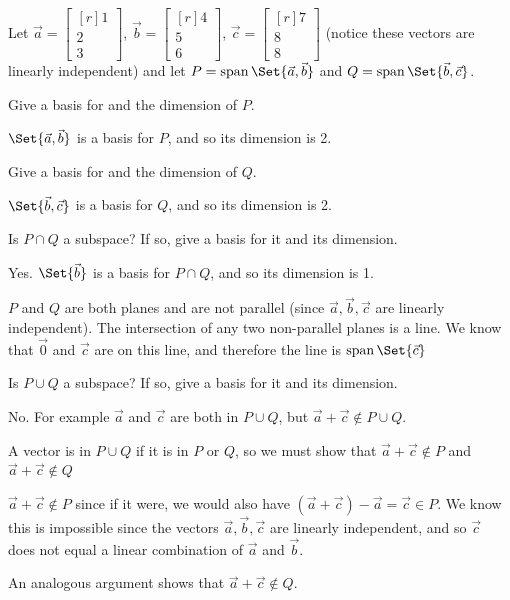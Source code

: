 \documentclass{problemset}
\DeclareMathOperator{\Span}{span}
\newcommand{\mat}[1]{\begin{bmatrix*}[r]#1\end{bmatrix*}}
\begin{document}
	\question
	Let $\vec a=\mat{1\\2\\3}$, $\vec b=\mat{4\\5\\6}$, $\vec c=\mat{7\\8\\8}$ (notice these vectors
	are linearly independent) and 
	let $P=\Span\Set{\vec a,\vec b}$ and $Q=\Span\Set{\vec b,\vec c}$.
	\begin{parts}
		\item Give a basis for and the dimension of $P$.
			\begin{solution}
				$\Set{\vec a,\vec b}$ is a basis for $P$, and so its dimension is 2. 
			\end{solution}
		\item Give a basis for and the dimension of $Q$.
			\begin{solution}
				$\Set{\vec b,\vec c}$ is a basis for $Q$, and so its dimension is 2. 
			\end{solution}
		\item Is $P\cap Q$ a subspace? If so, give a basis for it and its dimension.
			\begin{solution}
				Yes. $\Set{\vec b}$ is a basis for $P\cap Q$, and so its dimension is 1. 

				$P$ and $Q$ are both planes and are not parallel (since 
				$\vec a,\vec b,\vec c$ are linearly independent). The intersection
				of any two non-parallel	planes is a line. 
				We know that $\vec 0$ and $\vec c$ are on this line, and therefore
				the line is $\Span\Set{\vec c}$
			\end{solution}
		\item Is $P\cup Q$ a subspace? If so, give a basis for it and its dimension.
			\begin{solution}
				No. For example $\vec a$ and $\vec c$ are both in $P\cup Q$, but 
				$\vec a+\vec c \notin P\cup Q$. 

				A vector is in $P\cup Q$ if it is in $P$ or $Q$, so we must show
				that $\vec a+\vec c\notin P$ and $\vec a+\vec c\notin Q$

				$\vec a+\vec c \notin P$ since if it were, we would also have
				$(\vec a+\vec c)-\vec a=\vec c\in P$. We know this is impossible
				since the vectors $\vec a,\vec b,\vec c$ are linearly independent,
				and so $\vec c$ does not equal a linear combination of $\vec a$
				and $\vec b$. 

				An analogous argument shows that $\vec a+\vec c \notin Q$. 
			\end{solution}
	\end{parts}
\end{document}
